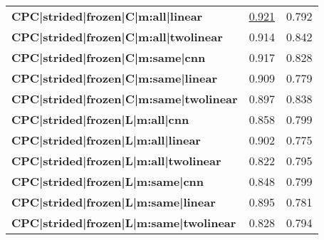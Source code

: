 \begin{adjustbox}{width=\textwidth}
\begin{tabular}{lrr}
\textbf{CPC|strided|frozen|C|m:all|linear    } &  \underline{0.921} &  0.792 \\
\textbf{CPC|strided|frozen|C|m:all|twolinear   } &  0.914 &  0.842 \\
\textbf{CPC|strided|frozen|C|m:same|cnn        } &  0.917 &  0.828 \\
\textbf{CPC|strided|frozen|C|m:same|linear   } &  0.909 &  0.779 \\
\textbf{CPC|strided|frozen|C|m:same|twolinear  } &  0.897 &  0.838 \\
\textbf{CPC|strided|frozen|L|m:all|cnn         } &  0.858 &  0.799 \\
\textbf{CPC|strided|frozen|L|m:all|linear    } &  0.902 &  0.775 \\
\textbf{CPC|strided|frozen|L|m:all|twolinear   } &  0.822 &  0.795 \\
\textbf{CPC|strided|frozen|L|m:same|cnn        } &  0.848 &  0.799 \\
\textbf{CPC|strided|frozen|L|m:same|linear   } &  0.895 &  0.781 \\
\textbf{CPC|strided|frozen|L|m:same|twolinear  } &  0.828 &  0.794 \\
\bottomrule
\end{tabular}
\end{adjustbox}